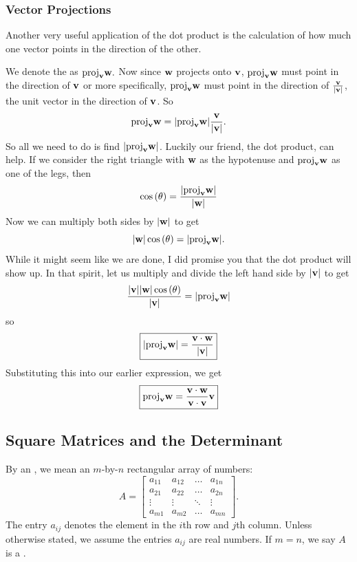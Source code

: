 \subsubsection{Vector Projections}
Another very useful application of the dot product is the calculation of how much one vector points in the direction of the other.

We denote the  as \( \mathrm{proj}_{\vb{v}}\vb{w} .\) Now since \( \vb{w} \) projects onto \( \vb{v} \), \( \mathrm{proj}_{\vb{v}}\vb{w} \) must point in the direction of \( \vb{v} \) or more specifically, \( \mathrm{proj}_{\vb{v}}\vb{w} \) must point in the direction of \( \frac{\vb{v}}{\abs{\vb{v}}} \), the unit vector in the direction of \( \vb{v} \). So 
\[ \mathrm{proj}_{\vb{v}}\vb{w} =\abs{\mathrm{proj}_{\vb{v}}\vb{w}} \frac{\vb{v}}{\abs{\vb{v}}} .\] So all we need to do is find \( \abs{\mathrm{proj}_{\vb{v}}\vb{w}}\). Luckily our friend, the dot product, can help. If we consider the right triangle with \( \vb{w} \) as the hypotenuse and \( \mathrm{proj}_{\vb{v}}\vb{w} \) as one of the legs, then 
\[ \cos{ \left( \theta \right) }= \frac{\abs{\mathrm{proj}_{\vb{v}}\vb{w}}}{\abs{\vb{w}}} \]
Now we can multiply both sides by \( \abs{\vb{w}} \) to get 
\[ \abs{\vb{w}} \cos{ \left( \theta  \right) } = \abs{\mathrm{proj}_{\vb{v}}\vb{w}} .\] While it might seem like we are done, I did promise you that the dot product will show up. In that spirit, let us multiply and divide the left hand side by \( \abs{\vb{v}} \) to get 
\[ \frac{\abs{\vb{v}} \abs{\vb{w}} \cos{ \left( \theta \right) }}{\abs{\vb{v}}}  = \abs{\mathrm{proj}_{\vb{v}}\vb{w}}\] so 
\[ \boxed{\abs{\mathrm{proj}_{\vb{v}}\vb{w}} = \frac{\vb{v} \cdot \vb{w}}{\abs{\vb{v}}}} \]
Substituting this into our earlier expression, we get 
\[ \boxed{\mathrm{proj}_{\vb{v}} \vb{w} = \frac{\vb{v} \cdot \vb{w}}{\vb{v} \cdot \vb{v}} \vb{v}} \]

\subsection{Square Matrices and the Determinant}

\begin{dfn}
    By an , we mean an \( m \)-by-\( n \) rectangular array of numbers:
    \[
        A = \begin{bmatrix}
            a_{11} & a_{12} & \dots & a_{1n} \\
            a_{21} & a_{22} & \dots & a_{2n} \\
            \vdots & \vdots & \ddots & \vdots \\
            a_{m1} & a_{m2} & \dots & a_{mn}
        \end{bmatrix}.
    \]
    The entry \(a_{ij}\) denotes the element in the \(i\)th row and \(j\)th column.  
    Unless otherwise stated, we assume the entries \(a_{ij}\) are real numbers.  
    If \(m = n\), we say \(A\) is a .  
\end{dfn}

